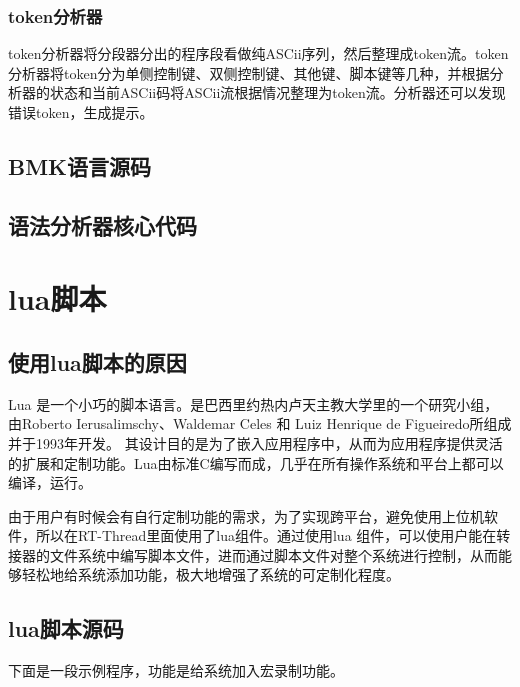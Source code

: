 \subsubsection{token分析器}
token分析器将分段器分出的程序段看做纯ASCii序列，然后整理成token流。token分析器将token分为单侧控制键、双侧控制键、其他键、脚本键等几种，并根据分析器的状态和当前ASCii码将ASCii流根据情况整理为token流。分析器还可以发现错误token，生成提示。

\subsection{BMK语言源码}


\subsection{语法分析器核心代码}



\section{lua脚本}
\subsection{使用lua脚本的原因}
Lua 是一个小巧的脚本语言。是巴西里约热内卢天主教大学里的一个研究小组，由Roberto Ierusalimschy、Waldemar Celes 和 Luiz Henrique de Figueiredo所组成并于1993年开发。 其设计目的是为了嵌入应用程序中，从而为应用程序提供灵活的扩展和定制功能。Lua由标准C编写而成，几乎在所有操作系统和平台上都可以编译，运行。

由于用户有时候会有自行定制功能的需求，为了实现跨平台，避免使用上位机软件，所以在RT-Thread里面使用了lua组件。通过使用lua 组件，可以使用户能在转接器的文件系统中编写脚本文件，进而通过脚本文件对整个系统进行控制，从而能够轻松地给系统添加功能，极大地增强了系统的可定制化程度。
\subsection{lua脚本源码}
下面是一段示例程序，功能是给系统加入宏录制功能。








